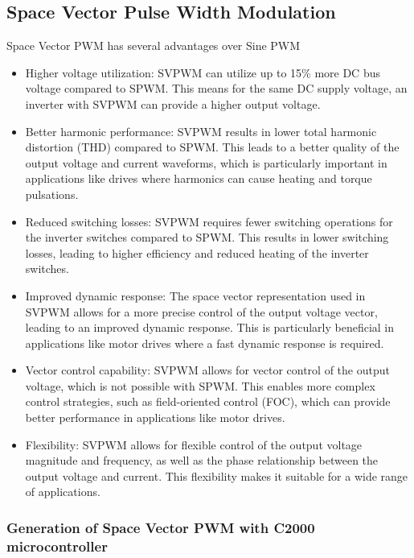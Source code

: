 \subsection{Space Vector Pulse Width Modulation}

Space Vector PWM has several advantages over Sine PWM

\begin{itemize}
    \item Higher voltage utilization: SVPWM can utilize up to 15\% more DC bus voltage compared to SPWM. This means for the same DC supply voltage, an inverter with SVPWM can provide a higher output voltage.

    \item Better harmonic performance: SVPWM results in lower total harmonic distortion (THD) compared to SPWM. This leads to a better quality of the output voltage and current waveforms, which is particularly important in applications like drives where harmonics can cause heating and torque pulsations.

    \item Reduced switching losses: SVPWM requires fewer switching operations for the inverter switches compared to SPWM. This results in lower switching losses, leading to higher efficiency and reduced heating of the inverter switches.

    \item Improved dynamic response: The space vector representation used in SVPWM allows for a more precise control of the output voltage vector, leading to an improved dynamic response. This is particularly beneficial in applications like motor drives where a fast dynamic response is required.

    \item Vector control capability: SVPWM allows for vector control of the output voltage, which is not possible with SPWM. This enables more complex control strategies, such as field-oriented control (FOC), which can provide better performance in applications like motor drives.

    \item Flexibility: SVPWM allows for flexible control of the output voltage magnitude and frequency, as well as the phase relationship between the output voltage and current. This flexibility makes it suitable for a wide range of applications. 
\end{itemize}

\subsubsection{Generation of Space Vector PWM with C2000 microcontroller}

